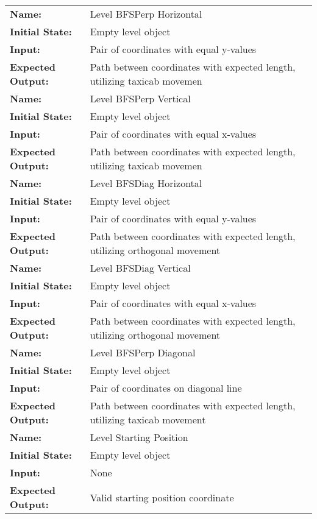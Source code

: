 \documentclass[12pt, titlepage]{article}
\begin{document}
\begin{center}
\begin{longtable}{ l | p{10cm} }
				\hline
				\rule{0pt}{2em}\textbf{Name:} & Level BFSPerp Horizontal\\
				\textbf{Initial State:} & Empty level object\\
				\textbf{Input:} & Pair of coordinates with equal y-values\\
				\textbf{Expected Output:} & Path between coordinates with expected length, utilizing taxicab movemen\\[1em]
				\hline
				\rule{0pt}{2em}\textbf{Name:} & Level BFSPerp Vertical\\
				\textbf{Initial State:} & Empty level object\\
				\textbf{Input:} & Pair of coordinates with equal x-values\\
				\textbf{Expected Output:} & Path between coordinates with expected length, utilizing taxicab movemen\\[1em]
				\hline
				\rule{0pt}{2em}\textbf{Name:} & Level BFSDiag Horizontal\\
				\textbf{Initial State:} & Empty level object\\
				\textbf{Input:} & Pair of coordinates with equal y-values\\
				\textbf{Expected Output:} & Path between coordinates with expected length, utilizing orthogonal movement\\[1em]
				\hline
				\rule{0pt}{2em}\textbf{Name:} & Level BFSDiag Vertical\\
				\textbf{Initial State:} & Empty level object\\
				\textbf{Input:} & Pair of coordinates with equal x-values\\
				\textbf{Expected Output:} & Path between coordinates with expected length, utilizing orthogonal movement\\[1em]
				\hline
				\rule{0pt}{2em}\textbf{Name:} & Level BFSPerp Diagonal\\
				\textbf{Initial State:} & Empty level object\\
				\textbf{Input:} & Pair of coordinates on diagonal line\\
				\textbf{Expected Output:} & Path between coordinates with expected length, utilizing taxicab movement\\[1em]
				\hline
				\rule{0pt}{2em}\textbf{Name:} & Level Starting Position\\
				\textbf{Initial State:} & Empty level object\\
				\textbf{Input:} & None\\
				\textbf{Expected Output:} & Valid starting position coordinate\\[1em]

\end{longtable}
\end{center}
\end{document}

